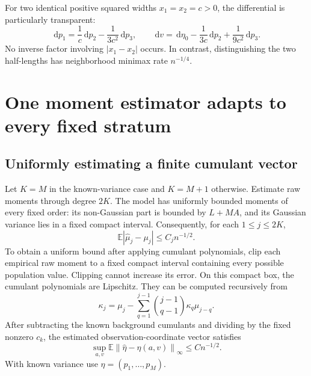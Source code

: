 \documentclass[11pt,a4paper]{article}
\numberwithin{equation}{section}
\theoremstyle{definition}
\theoremstyle{remark}
\newcommand{\E}{\mathbb E}
\newcommand{\dd}{\,\mathrm d}
\newcommand{\norm}[1]{\left\lVert#1\right\rVert}
\newcommand{\kap}{\kappa}
\begin{document}
For two identical positive squared widths $x_1=x_2=c>0$, the differential is
particularly transparent:
\begin{equation}
 \dd p_1=\frac{1}{c}\dd p_2-\frac{1}{3c^2}\dd p_3,
 \qquad
 \dd v=\dd\eta_0-\frac{1}{3c}\dd p_2+\frac{1}{9c^2}\dd p_3.
\end{equation}
No inverse factor involving $|x_1-x_2|$ occurs. In contrast, distinguishing
the two half-lengths has neighborhood minimax rate $n^{-1/4}$.

\section{One moment estimator adapts to every fixed stratum}
\label{sec:upper}

\subsection{Uniformly estimating a finite cumulant vector}
Let $K=M$ in the known-variance case and $K=M+1$ otherwise. Estimate raw
moments through degree $2K$. The model has uniformly bounded moments of every
fixed order: its non-Gaussian part is bounded by $L+MA$, and its Gaussian
variance lies in a fixed compact interval. Consequently, for each
$1\le j\le2K$,
\begin{equation}
 \E|\widehat\mu_j-\mu_j|\le C_jn^{-1/2}.
\end{equation}
To obtain a uniform bound after applying cumulant polynomials, clip each
empirical raw moment to a fixed compact interval containing every possible
population value. Clipping cannot increase its error. On this compact box,
the cumulant polynomials are Lipschitz. They can be computed recursively from
\begin{equation}
 \kap_j=\mu_j-\sum_{q=1}^{j-1}
       \binom{j-1}{q-1}\kap_q\mu_{j-q}.
 \label{eq:cumulantrecurrence}
\end{equation}
After subtracting the known background cumulants and dividing by the fixed
nonzero $c_k$, the estimated observation-coordinate vector satisfies
\begin{equation}
 \sup_{a,v}\E\norm{\widehat\eta-\eta(a,v)}_\infty\le Cn^{-1/2}.
 \label{eq:etamean}
\end{equation}
With known variance use $\eta=(p_1,\ldots,p_M)$.
\end{document}
